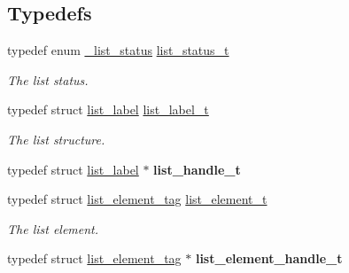 \subsection*{Typedefs}
\begin{DoxyCompactItemize}
\item 
typedef enum \mbox{\hyperlink{group___generic_list_ga803f4a1563b84327f6c4ece67bee52ff}{\+\_\+list\+\_\+status}} \mbox{\hyperlink{group___generic_list_gaae3dc4a15b24287b8c3ac8706195aa7e}{list\+\_\+status\+\_\+t}}
\begin{DoxyCompactList}\small\item\em The list status. \end{DoxyCompactList}\item 
\mbox{\label{group___generic_list_ga55ca6411baa0fa3fdf11f12b1b597eae}} 
typedef struct \mbox{\hyperlink{structlist__label}{list\+\_\+label}} \mbox{\hyperlink{group___generic_list_ga55ca6411baa0fa3fdf11f12b1b597eae}{list\+\_\+label\+\_\+t}}
\begin{DoxyCompactList}\small\item\em The list structure. \end{DoxyCompactList}\item 
\mbox{\label{group___generic_list_ga3b6160f7fecb9e59b14985c725602a80}} 
typedef struct \mbox{\hyperlink{structlist__label}{list\+\_\+label}} $\ast$ {\bfseries list\+\_\+handle\+\_\+t}
\item 
\mbox{\label{group___generic_list_gaaf37a4cc3cea190f1e70556b0db5a622}} 
typedef struct \mbox{\hyperlink{structlist__element__tag}{list\+\_\+element\+\_\+tag}} \mbox{\hyperlink{group___generic_list_gaaf37a4cc3cea190f1e70556b0db5a622}{list\+\_\+element\+\_\+t}}
\begin{DoxyCompactList}\small\item\em The list element. \end{DoxyCompactList}\item 
\mbox{\label{group___generic_list_ga1e44fd3b5d824f4ecfa858e3eba25a49}} 
typedef struct \mbox{\hyperlink{structlist__element__tag}{list\+\_\+element\+\_\+tag}} $\ast$ {\bfseries list\+\_\+element\+\_\+handle\+\_\+t}
\end{DoxyCompactItemize}
